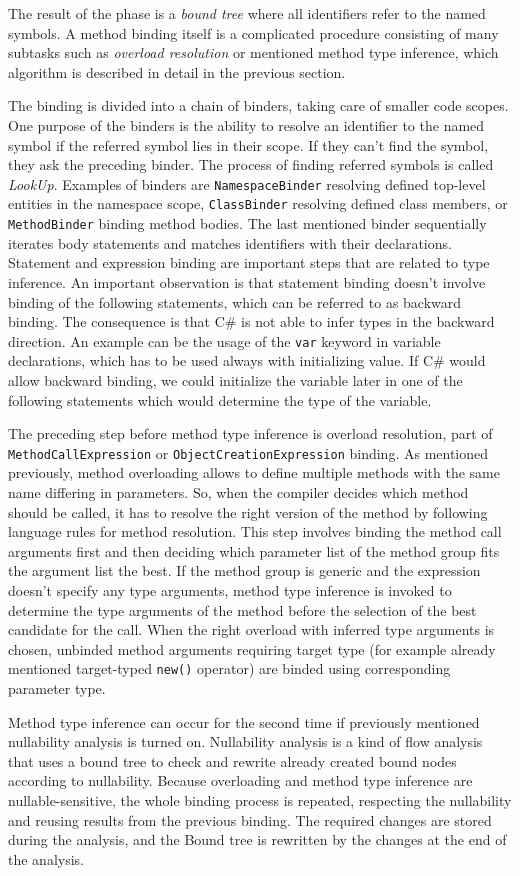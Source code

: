 The result of the phase is a \emph{bound tree} where all identifiers refer to the named symbols. 
A method binding itself is a complicated procedure consisting of many subtasks such as \emph{overload resolution} or mentioned method type inference, which algorithm is described in detail in the previous section.
\par
The binding is divided into a chain of binders, taking care of smaller code scopes. 
One purpose of the binders is the ability to resolve an identifier to the named symbol if the referred symbol lies in their scope. 
If they can’t find the symbol, they ask the preceding binder. 
The process of finding referred symbols is called \emph{LookUp}. 
Examples of binders are \texttt{NamespaceBinder} resolving defined top-level entities in the namespace scope, \texttt{ClassBinder} resolving defined class members, or \texttt{MethodBinder} binding method bodies. 
The last mentioned binder sequentially iterates body statements and matches identifiers with their declarations. 
Statement and expression binding are important steps that are related to type inference.
An important observation is that statement binding doesn’t involve binding of the following statements, which can be referred to as backward binding. 
The consequence is that C\# is not able to infer types in the backward direction. 
An example can be the usage of the \texttt{var} keyword in variable declarations, which has to be used always with initializing value. 
If C\# would allow backward binding, we could initialize the variable later in one of the following statements which would determine the type of the variable.
\par
The preceding step before method type inference is overload resolution, part of \texttt{MethodCallExpression} or \texttt{ObjectCreationExpression} binding. 
As mentioned previously, method overloading allows to define multiple methods with the same name differing in parameters. 
So, when the compiler decides which method should be called, it has to resolve the right version of the method by following language rules for method resolution. 
This step involves binding the method call arguments first and then deciding which parameter list of the method group fits the argument list the best. 
If the method group is generic and the expression doesn’t specify any type arguments, method type inference is invoked to determine the type arguments of the method before the selection of the best candidate for the call.
When the right overload with inferred type arguments is chosen, unbinded method arguments requiring target type (for example already mentioned target-typed \texttt{new()} operator) are binded using corresponding parameter type.
\par
Method type inference can occur for the second time if previously mentioned nullability analysis is turned on. 
Nullability analysis is a kind of flow analysis that uses a bound tree to check and rewrite already created bound nodes according to nullability. 
Because overloading and method type inference are nullable-sensitive, the whole binding process is repeated, respecting the nullability and reusing results from the previous binding. 
The required changes are stored during the analysis, and the Bound tree is rewritten by the changes at the end of the analysis.

